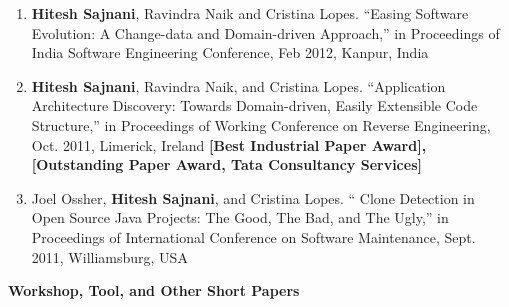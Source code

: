 \documentclass[letterpaper,11pt]{article}
\begin{document}
\begin{enumerate}
{of Structured Artifact Repositories,” Proceedings of Working Conference on Reverse
Engineering, Oct. 2012, Kingston, Canada }
 \vspace{-1pt}\item\small{\textbf{Hitesh Sajnani}, Ravindra Naik and Cristina Lopes. “Easing Software Evolution: A
Change-data and Domain-driven Approach,” in Proceedings of India Software Engineering
Conference, Feb 2012, Kanpur, India }
 \vspace{-1pt}\item\small{\textbf{Hitesh Sajnani}, Ravindra Naik, and Cristina Lopes. “Application Architecture Discovery:
Towards Domain-driven, Easily Extensible Code Structure,” in Proceedings of
Working Conference on Reverse Engineering, Oct. 2011, Limerick, Ireland \textbf{[Best Industrial
Paper Award], [Outstanding Paper Award, Tata Consultancy Services]} }
 \vspace{-1pt}\item\small{Joel Ossher, \textbf{Hitesh Sajnani}, and Cristina Lopes. “ Clone Detection in Open Source
Java Projects: The Good, The Bad, and The Ugly,” in Proceedings of International
Conference on Software Maintenance, Sept. 2011, Williamsburg, USA }

\end{enumerate}
\textbf{Workshop, Tool, and Other Short Papers}
\end{document}
